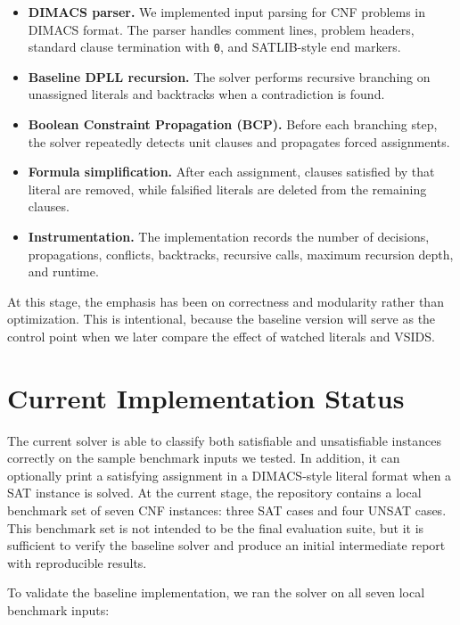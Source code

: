 \documentclass[11pt]{article}
\begin{document}
\begin{itemize}
    \item \textbf{DIMACS parser.} We implemented input parsing for CNF problems in DIMACS
    format. The parser handles comment lines, problem headers, standard clause termination with
    \texttt{0}, and SATLIB-style end markers.
    \item \textbf{Baseline DPLL recursion.} The solver performs recursive branching on
    unassigned literals and backtracks when a contradiction is found.
    \item \textbf{Boolean Constraint Propagation (BCP).} Before each branching step, the solver
    repeatedly detects unit clauses and propagates forced assignments.
    \item \textbf{Formula simplification.} After each assignment, clauses satisfied by that literal
    are removed, while falsified literals are deleted from the remaining clauses.
    \item \textbf{Instrumentation.} The implementation records the number of decisions,
    propagations, conflicts, backtracks, recursive calls, maximum recursion depth, and runtime.
\end{itemize}

At this stage, the emphasis has been on correctness and modularity rather than optimization. This
is intentional, because the baseline version will serve as the control point when we later compare
the effect of watched literals and VSIDS.

\section{Current Implementation Status}

The current solver is able to classify both satisfiable and unsatisfiable instances correctly on the
sample benchmark inputs we tested. In addition, it can optionally print a satisfying assignment in a
DIMACS-style literal format when a SAT instance is solved. At the current stage, the repository
contains a local benchmark set of seven CNF instances: three SAT cases and four UNSAT cases.
This benchmark set is not intended to be the final evaluation suite, but it is sufficient to verify the
baseline solver and produce an initial intermediate report with reproducible results.

To validate the baseline implementation, we ran the solver on all seven local benchmark inputs:
\end{document}
